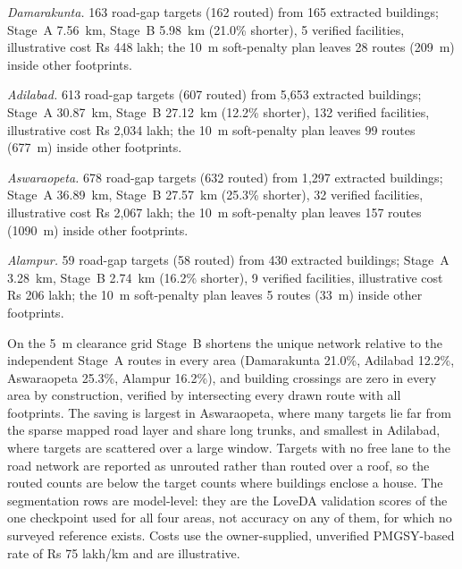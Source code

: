 \documentclass[12pt,a4paper]{article}
\begin{document}
\emph{Damarakunta.} 163 road-gap targets (162 routed) from 165 extracted buildings; Stage~A 7.56~km, Stage~B 5.98~km (21.0\% shorter), 5 verified facilities, illustrative cost Rs 448 lakh; the 10~m soft-penalty plan leaves 28 routes (209~m) inside other footprints.

\emph{Adilabad.} 613 road-gap targets (607 routed) from 5{,}653 extracted buildings; Stage~A 30.87~km, Stage~B 27.12~km (12.2\% shorter), 132 verified facilities, illustrative cost Rs 2{,}034 lakh; the 10~m soft-penalty plan leaves 99 routes (677~m) inside other footprints.

\emph{Aswaraopeta.} 678 road-gap targets (632 routed) from 1{,}297 extracted buildings; Stage~A 36.89~km, Stage~B 27.57~km (25.3\% shorter), 32 verified facilities, illustrative cost Rs 2{,}067 lakh; the 10~m soft-penalty plan leaves 157 routes (1090~m) inside other footprints.

\emph{Alampur.} 59 road-gap targets (58 routed) from 430 extracted buildings; Stage~A 3.28~km, Stage~B 2.74~km (16.2\% shorter), 9 verified facilities, illustrative cost Rs 206 lakh; the 10~m soft-penalty plan leaves 5 routes (33~m) inside other footprints.

On the 5~m clearance grid Stage~B shortens the unique network relative to the independent Stage~A routes in every area (Damarakunta 21.0\%, Adilabad 12.2\%, Aswaraopeta 25.3\%, Alampur 16.2\%), and building crossings are zero in every area by construction, verified by intersecting every drawn route with all footprints. The saving is largest in Aswaraopeta, where many targets lie far from the sparse mapped road layer and share long trunks, and smallest in Adilabad, where targets are scattered over a large window. Targets with no free lane to the road network are reported as unrouted rather than routed over a roof, so the routed counts are below the target counts where buildings enclose a house. The segmentation rows are model-level: they are the LoveDA validation scores of the one checkpoint used for all four areas, not accuracy on any of them, for which no surveyed reference exists. Costs use the owner-supplied, unverified PMGSY-based rate of Rs 75 lakh/km and are illustrative.
\end{document}
